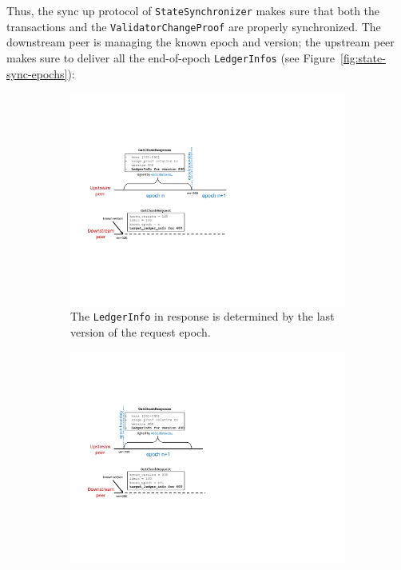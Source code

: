 \documentclass[letterpaper,10pt]{article}
\begin{document}
Thus, the sync up protocol of \texttt{StateSynchronizer} makes sure that both the transactions and the \texttt{ValidatorChangeProof} are properly synchronized. The downstream peer is managing the known epoch and version; the upstream peer makes sure to deliver all the end-of-epoch \texttt{LedgerInfos} (see Figure~\ref{fig:state-sync-epochs}):

\begin{figure}[ht]
    \centering
    \begin{subfigure}{0.47\textwidth}
        \centering
        \includegraphics[height=0.8\textwidth]{figures/state-sync-epochs-1.pdf}
        \caption{\footnotesize{The \texttt{LedgerInfo} in response is determined by the last version of the request epoch.}}
        \label{fig:state-sync-epochs-1}
    \end{subfigure}
    \begin{subfigure}{0.47\textwidth}
        \centering
        \includegraphics[height=0.8\textwidth]{figures/state-sync-epochs-2.pdf}

\end{subfigure}
\end{figure}
\end{document}
